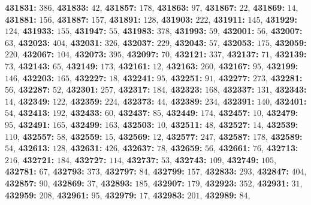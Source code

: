 \textsf{\bfseries 431831:} $386$, \textsf{\bfseries 431833:} $42$, \textsf{\bfseries 431857:} $178$, \textsf{\bfseries 431863:} $97$, \textsf{\bfseries 431867:} $22$, \textsf{\bfseries 431869:} $14$, \textsf{\bfseries 431881:} $156$, \textsf{\bfseries 431887:} $157$, \textsf{\bfseries 431891:} $128$, \textsf{\bfseries 431903:} $222$, \textsf{\bfseries 431911:} $145$, \textsf{\bfseries 431929:} $124$, \textsf{\bfseries 431933:} $155$, \textsf{\bfseries 431947:} $55$, \textsf{\bfseries 431983:} $378$, \textsf{\bfseries 431993:} $59$, \textsf{\bfseries 432001:} $56$, \textsf{\bfseries 432007:} $63$, \textsf{\bfseries 432023:} $404$, \textsf{\bfseries 432031:} $326$, \textsf{\bfseries 432037:} $229$, \textsf{\bfseries 432043:} $57$, \textsf{\bfseries 432053:} $175$, \textsf{\bfseries 432059:} $220$, \textsf{\bfseries 432067:} $104$, \textsf{\bfseries 432073:} $395$, \textsf{\bfseries 432097:} $70$, \textsf{\bfseries 432121:} $337$, \textsf{\bfseries 432137:} $71$, \textsf{\bfseries 432139:} $73$, \textsf{\bfseries 432143:} $65$, \textsf{\bfseries 432149:} $173$, \textsf{\bfseries 432161:} $12$, \textsf{\bfseries 432163:} $260$, \textsf{\bfseries 432167:} $95$, \textsf{\bfseries 432199:} $146$, \textsf{\bfseries 432203:} $165$, \textsf{\bfseries 432227:} $18$, \textsf{\bfseries 432241:} $95$, \textsf{\bfseries 432251:} $91$, \textsf{\bfseries 432277:} $273$, \textsf{\bfseries 432281:} $56$, \textsf{\bfseries 432287:} $52$, \textsf{\bfseries 432301:} $257$, \textsf{\bfseries 432317:} $184$, \textsf{\bfseries 432323:} $168$, \textsf{\bfseries 432337:} $131$, \textsf{\bfseries 432343:} $14$, \textsf{\bfseries 432349:} $122$, \textsf{\bfseries 432359:} $224$, \textsf{\bfseries 432373:} $44$, \textsf{\bfseries 432389:} $234$, \textsf{\bfseries 432391:} $140$, \textsf{\bfseries 432401:} $54$, \textsf{\bfseries 432413:} $192$, \textsf{\bfseries 432433:} $60$, \textsf{\bfseries 432437:} $85$, \textsf{\bfseries 432449:} $174$, \textsf{\bfseries 432457:} $10$, \textsf{\bfseries 432479:} $95$, \textsf{\bfseries 432491:} $165$, \textsf{\bfseries 432499:} $163$, \textsf{\bfseries 432503:} $10$, \textsf{\bfseries 432511:} $48$, \textsf{\bfseries 432527:} $14$, \textsf{\bfseries 432539:} $110$, \textsf{\bfseries 432557:} $58$, \textsf{\bfseries 432559:} $15$, \textsf{\bfseries 432569:} $12$, \textsf{\bfseries 432577:} $247$, \textsf{\bfseries 432587:} $178$, \textsf{\bfseries 432589:} $54$, \textsf{\bfseries 432613:} $128$, \textsf{\bfseries 432631:} $426$, \textsf{\bfseries 432637:} $78$, \textsf{\bfseries 432659:} $56$, \textsf{\bfseries 432661:} $76$, \textsf{\bfseries 432713:} $216$, \textsf{\bfseries 432721:} $184$, \textsf{\bfseries 432727:} $114$, \textsf{\bfseries 432737:} $53$, \textsf{\bfseries 432743:} $109$, \textsf{\bfseries 432749:} $105$, \textsf{\bfseries 432781:} $67$, \textsf{\bfseries 432793:} $373$, \textsf{\bfseries 432797:} $84$, \textsf{\bfseries 432799:} $157$, \textsf{\bfseries 432833:} $293$, \textsf{\bfseries 432847:} $404$, \textsf{\bfseries 432857:} $90$, \textsf{\bfseries 432869:} $37$, \textsf{\bfseries 432893:} $185$, \textsf{\bfseries 432907:} $179$, \textsf{\bfseries 432923:} $352$, \textsf{\bfseries 432931:} $31$, \textsf{\bfseries 432959:} $208$, \textsf{\bfseries 432961:} $95$, \textsf{\bfseries 432979:} $17$, \textsf{\bfseries 432983:} $201$, \textsf{\bfseries 432989:} $84$, 

